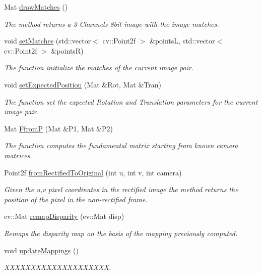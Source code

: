 \begin{DoxyCompactItemize}
Mat \hyperlink{classStereoCamera_a6580ff03c7cec5c385ec717f9c018e21}{draw\+Matches} ()
\begin{DoxyCompactList}\small\item\em The method returns a 3-\/\+Channels 8bit image with the image matches. \end{DoxyCompactList}\item 
void \hyperlink{classStereoCamera_ae683fafa11ea73e4b4c278402be259b6}{set\+Matches} (std\+::vector$<$ cv\+::\+Point2f $>$ \&pointsL, std\+::vector$<$ cv\+::\+Point2f $>$ \&pointsR)
\begin{DoxyCompactList}\small\item\em The function initialize the matches of the current image pair. \end{DoxyCompactList}\item 
void \hyperlink{classStereoCamera_a9ecb303d7b36eaf5f086d8ddebd29b95}{set\+Expected\+Position} (Mat \&Rot, Mat \&Tran)
\begin{DoxyCompactList}\small\item\em The function set the expected Rotation and Translation parameters for the current image pair. \end{DoxyCompactList}\item 
Mat \hyperlink{classStereoCamera_a3fe4e87322f8644cd21ce06e8522c815}{FfromP} (Mat \&P1, Mat \&P2)
\begin{DoxyCompactList}\small\item\em The function computes the fundamental matrix starting from known camera matrices. \end{DoxyCompactList}\item 
Point2f \hyperlink{classStereoCamera_a3d8fde0cbd4604085b883f22cc606c01}{from\+Rectified\+To\+Original} (int u, int v, int camera)
\begin{DoxyCompactList}\small\item\em Given the u,v pixel coordinates in the rectified image the method returns the position of the pixel in the non-\/rectified frame. \end{DoxyCompactList}\item 
cv\+::\+Mat \hyperlink{classStereoCamera_ac92ce0b90b69773284be5825b0199bda}{remap\+Disparity} (cv\+::\+Mat disp)
\begin{DoxyCompactList}\small\item\em Remaps the disparity map on the basis of the mapping previously computed. \end{DoxyCompactList}\item 
void \hyperlink{classStereoCamera_a5b15c07def1c09f53bfc6141f303fa09}{update\+Mappings} ()
\begin{DoxyCompactList}\small\item\em X\+X\+X\+X\+X\+X\+X\+X\+X\+X\+X\+X\+X\+X\+X\+X\+X\+X\+XX. \end{DoxyCompactList}\end{DoxyCompactItemize}
